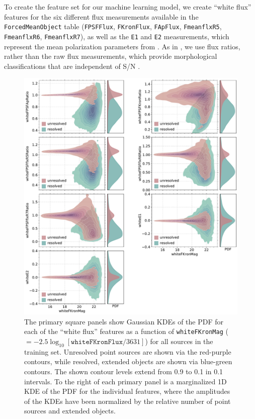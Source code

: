\documentclass[twocolumn]{aastex63}
\begin{document}
To create the feature set for our machine learning model, we create ``white
flux'' features for the six different flux measurements available in the
\texttt{ForcedMeanObject} table (\texttt{FPSFFlux}, \texttt{FKronFlux},
\texttt{FApFlux}, \texttt{FmeanflxR5}, \texttt{FmeanflxR6},
\texttt{FmeanflxR7}), as well as the \texttt{E1} and \texttt{E2} measurements,
which represent the mean polarization parameters from \citet{Kaiser95}. As in
\citet{Tachibana18}, we use flux ratios, rather than the raw flux
measurements, which provide morphological classifications that are independent
of S/N \citep{Lupton01}.

\begin{figure}
    \centering
    \includegraphics[width=6.5in]{./figures/whiteFeatures.pdf}
    \caption{The primary square panels show Gaussian KDEs of the PDF for each
    of the ``white flux'' features as a function of \texttt{whiteFKronMag}
    ($=-2.5\log_{10}[\mathtt{whiteFKronFlux}/3631]$) for all sources in the
    training set. Unresolved point sources are shown via the red-purple
    contours, while resolved, extended objects are shown via blue-green
    contours. The shown contour levels extend from 0.9 to 0.1 in 0.1
    intervals. To the right of each primary panel is a marginalized 1D KDE of
    the PDF for the individual features, where the amplitudes of the KDEs have
    been normalized by the relative number of point sources and extended
    objects.}
    \label{fig:features}
\end{figure} 
\end{document}
